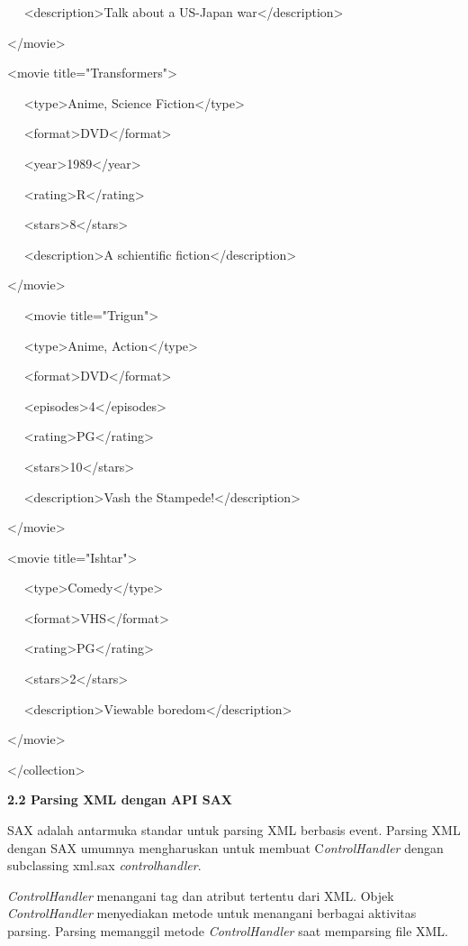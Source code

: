 \noindent 
~~ <description>Talk about a US-Japan war</description> \par
\noindent 
</movie> \par
\noindent 
<movie title="Transformers"> \par
\noindent 
~~ <type>Anime, Science Fiction</type> \par
\noindent 
~~ <format>DVD</format> \par
\noindent 
~~ <year>1989</year> \par
\noindent 
~~ <rating>R</rating> \par
\noindent 
~~ <stars>8</stars> \par
\noindent 
~~ <description>A schientific fiction</description> \par
\noindent 
</movie> \par
\noindent 
~~ <movie title="Trigun"> \par
\noindent 
~~ <type>Anime, Action</type> \par
\noindent 
~~ <format>DVD</format> \par
\noindent 
~~ <episodes>4</episodes> \par
\noindent 
~~ <rating>PG</rating> \par
\noindent 
~~ <stars>10</stars> \par
\noindent 
~~ <description>Vash the Stampede!</description> \par
\noindent 
</movie> \par
\noindent 
<movie title="Ishtar"> \par
\noindent 
~~ <type>Comedy</type> \par
\noindent 
~~ <format>VHS</format> \par
\noindent 
~~ <rating>PG</rating> \par
\noindent 
~~ <stars>2</stars> \par
\noindent 
~~ <description>Viewable boredom</description> \par
\noindent 
</movie> \par
\noindent 
</collection> \par
\vspace{10pt}
\noindent 
\textbf{2.2 Parsing XML dengan API SAX} \par
\noindent 
 \hspace*{0.5in} SAX adalah antarmuka standar untuk parsing XML berbasis event. Parsing XML dengan SAX umumnya mengharuskan untuk membuat C\textit{ontrolHandler }dengan subclassing xml.sax \textit{controlhandler}. \par
\noindent 
 \hspace*{0.5in} \textit{ControlHandler }menangani tag dan atribut tertentu dari XML. Objek \textit{ControlHandler }menyediakan metode untuk menangani berbagai aktivitas parsing. Parsing memanggil metode \textit{ControlHandler }saat memparsing file XML. \par
